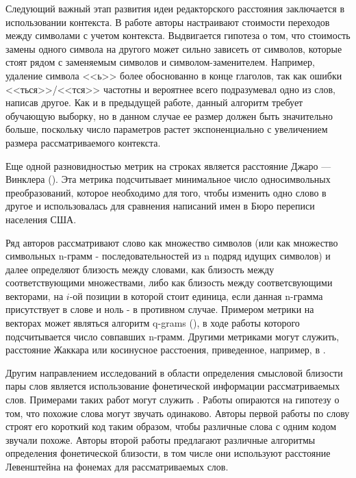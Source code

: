 Следующий важный этап развития идеи редакторского расстояния заключается в использовании контекста. В работе \cite{context_leven} авторы настраивают стоимости переходов между символами с учетом контекста. Выдвигается гипотеза о том, что стоимость замены одного символа на другого может сильно зависеть от символов, которые стоят рядом с заменяемым символов и символом-заменителем. Например, удаление символа <<ь>> более обоснованно в конце глаголов, так как ошибки <<ться>>/<<тся>> частотны и вероятнее всего подразумевал одно из слов, написав другое. Как и в предыдущей работе, данный алгоритм требует обучающую выборку, но в данном случае ее размер должен быть значительно больше, поскольку число параметров растет экспоненциально с увеличением размера рассматриваемого контекста.

Еще одной разновидностью метрик на строках является расстояние Джаро — Винклера (\cite{jaro1,jaro2}). Эта метрика подсчитывает минимальное число односимвольных преобразований, которое необходимо для того, чтобы изменить одно слово в другое и использовалась для сравнения написаний имен в Бюро переписи населения США.

Ряд авторов рассматривают слово как множество символов (или как множество символьных n-грамм - последовательностей из n подряд идущих символов) и далее определяют близость между словами, как близость между соответствующими множествами, либо как близость между соответсвующими векторами, на $i$-ой позиции в которой стоит единица, если данная n-грамма присутствует в слове и ноль - в противном случае. Примером метрики на векторах может являться алгоритм q-grams (\cite{qgrams}), в ходе работы которого подсчитывается число совпавших n-грамм. Другими метриками могут служить,  расстояние Жаккара или косинусное расстоения, приведенное, например, в \cite{sim_metr}.

Другим направлением исследований в области определения смысловой близости пары слов является использование фонетической информации рассматриваемых слов. Примерами таких работ могут служить \cite{soundex,phone_sim}. Работы опираются на гипотезу о том, что похожие слова могут звучать одинаково. Авторы первой работы по слову строят его короткий код таким образом, чтобы различные слова с одним кодом звучали похоже. Авторы второй работы предлагают различные алгоритмы определения фонетической близости, в том числе они используют расстояние Левенштейна на фонемах для рассматриваемых слов.

